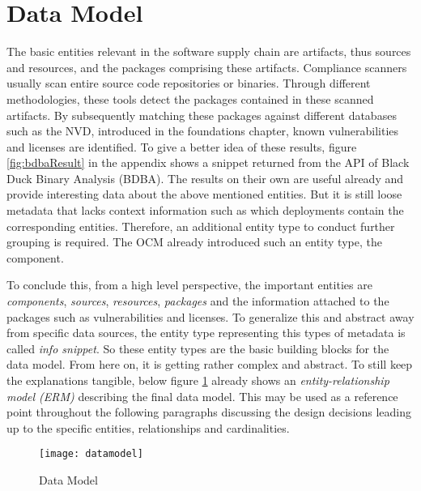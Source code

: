 \section{Data Model}
The basic entities relevant in the software supply chain are artifacts, thus sources and resources, and the packages comprising these artifacts. Compliance scanners usually scan entire source code repositories or binaries. Through different methodologies, these tools detect the packages contained in these scanned artifacts. By subsequently matching these packages against different databases such as the NVD, introduced in the foundations chapter, known vulnerabilities and licenses are identified. To give a better idea of these results, figure \ref{fig:bdbaResult} in the appendix shows a snippet returned from the API of Black Duck Binary Analysis (BDBA). The results on their own are useful already and provide interesting data about the above mentioned entities. But it is still loose metadata that lacks context information such as which deployments contain the corresponding entities. Therefore, an additional entity type to conduct further grouping is required. The OCM already introduced such an entity type, the component.\par
To conclude this, from a high level perspective, the important entities are \emph{components}, \emph{sources}, \emph{resources}, \emph{packages} and the information attached to the packages such as vulnerabilities and licenses. To generalize this and abstract away from specific data sources, the entity type representing this types of metadata is called \emph{info snippet}. So these entity types are the basic building blocks for the data model. From here on, it is getting rather complex and abstract. To still keep the explanations tangible, below figure \ref{fig:DataModel} already shows an \emph{entity-relationship model (ERM)} describing the final data model. This may be used as a reference point throughout the following paragraphs discussing the design decisions leading up to the specific entities, relationships and cardinalities.

\begin{figure}[H]
	\centering
	\texttt{[image: datamodel]}
	\caption[Data Model]{Data Model }
	\label{fig:DataModel}
\end{figure} 

